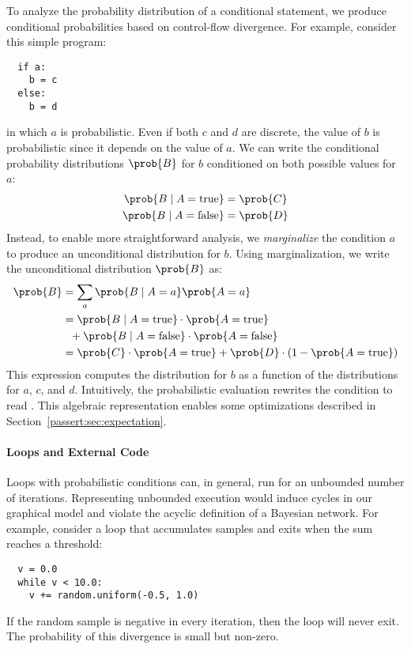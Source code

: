 To analyze the probability distribution of a conditional statement,
we produce conditional probabilities
based on control-flow divergence. For example, consider this simple
program:
%
\begin{lstlisting}
  if a:
    b = c
  else:
    b = d
\end{lstlisting}
%
in which $a$ is probabilistic. Even if both $c$
and $d$ are discrete, the value of $b$ is probabilistic since it depends on
the value of $a$. We can write the conditional probability distributions $\prob{B}$
for $b$ conditioned on both possible values for $a$:
%
\begin{align*}
    \prob{B \;|\; A = \mathrm{true}} &= \prob{C}\\
    \prob{B \;|\; A = \mathrm{false}} &= \prob{D}
\end{align*}
%
Instead, to enable more
straightforward analysis, we \emph{marginalize} the condition $a$ to
produce an unconditional distribution for $b$. Using marginalization, we
write the unconditional distribution $\prob{B}$ as:
%
\begin{align*}
    \prob{B} &= \sum_a \prob{B\;|\; A = a} \prob{A = a} \\
           &= \prob{B \;|\; A = \mathrm{true}} \cdot \prob{A = \mathrm{true}}
    \\
    & \> \> \> + \prob{B \;|\; A = \mathrm{false}} \cdot \prob{A = \mathrm{false}} \\
           &= \prob{C} \cdot \prob{A=\mathrm{true}}
            + \prob{D} \cdot (1 - \prob{A=\mathrm{true}})
\end{align*}
%
This expression computes the distribution for $b$ as a function of the
distributions for $a$, $c$, and $d$. Intuitively, the probabilistic evaluation rewrites
the condition to read . This algebraic
representation enables some optimizations described
in Section~\ref{passert:sec:expectation}.

\label{passert:sec:loops}


\paragraph{Loops and External Code}
Loops with probabilistic conditions can, in general, run for an
unbounded number of iterations. Representing unbounded execution would
induce cycles in our graphical
model and violate the acyclic definition of a Bayesian network. For
example, consider a loop that accumulates samples and exits when the
sum reaches a threshold:
%
\begin{lstlisting}
  v = 0.0
  while v < 10.0:
    v += random.uniform(-0.5, 1.0)
\end{lstlisting}
%
If the random sample is negative in every iteration, then the
loop will never exit. The probability of this divergence is small but non-zero.

